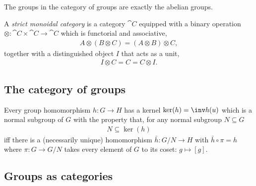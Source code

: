 \documentclass{article}
\begin{document}
\begin{corollary}[Awodey p. 79]
    The groups in the category of groups are exactly the abelian groups.
\end{corollary}

\begin{definition}[Awodey p. 79]
    A \emph{strict monoidal category} is a category $\cat C$ equipped with a
    binary operation $\otimes:\cat C\times \cat C\to \cat C$ which is functorial
    and associative,
    \begin{align*}
        A\otimes(B\otimes C) = (A\otimes B)\otimes C,
    \end{align*}
    together with a distinguished object $I$ that acts as a unit,
    \begin{align*}
        I\otimes C = C = C \otimes I.
    \end{align*}
\end{definition}

\subsection{The category of groups}

\begin{theorem}[Awodey p. 83]
    Every group homomorphism $h:G\to H$ has a kernel $\ker(h)=\inv h(u)$
    which is a normal subgroup of $G$ with the property that, for any normal
    subgroup $N\subseteq G$
    \begin{align*}
        N\subseteq \ker(h)
    \end{align*}
    iff there is a (necessarily unique) homomorphism
    $\bar h:G/N\to H$ with $\bar h \circ \pi = h$ where
    $\pi:G\to G/N$ takes every element of $G$ to its
    coset: $g\mapsto [g]$.
\end{theorem}

\subsection{Groups as categories}
\end{document}
